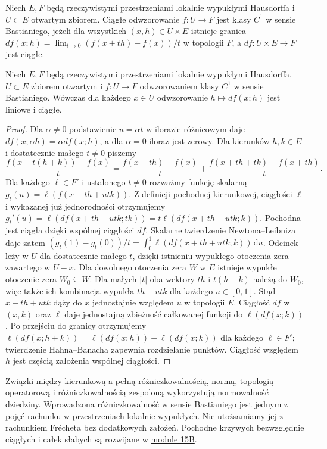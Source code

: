 \begin{definicja}
\label{def:bastiani14}
Niech $E,F$ będą rzeczywistymi przestrzeniami lokalnie
wypukłymi Hausdorffa i $U\subset E$ otwartym zbiorem.
Ciągłe odwzorowanie $f:U\to F$ jest klasy $C^1$ w sensie
Bastianiego, jeżeli dla wszystkich $(x,h)\in U\times E$
istnieje granica $df(x;h)=\lim_{t\to0}(f(x+th)-f(x))/t$
w topologii $F$, a $df:U\times E\to F$ jest ciągłe.
\end{definicja}
\begin{stwierdzenie}
\label{prop:bastiani-linear14}
Niech $E,F$ będą rzeczywistymi przestrzeniami lokalnie
wypukłymi Hausdorffa, $U\subset E$ zbiorem otwartym
i $f:U\to F$ odwzorowaniem klasy $C^1$ w sensie Bastianiego.
Wówczas dla każdego $x\in U$
odwzorowanie $h\mapsto df(x;h)$ jest liniowe i ciągłe.
\end{stwierdzenie}
\begin{proof}
Dla $\alpha\ne0$ podstawienie $u=\alpha t$ w ilorazie
różnicowym daje $df(x;\alpha h)=\alpha df(x;h)$,
a dla $\alpha=0$ iloraz jest zerowy. Dla kierunków
$h,k\in E$ i dostatecznie małego $t\ne0$ piszemy
\[
 \frac{f(x+t(h+k))-f(x)}{t}
 =\frac{f(x+th)-f(x)}t
  +\frac{f(x+th+tk)-f(x+th)}t .
\]
Dla każdego $\ell\in F'$ i ustalonego $t\ne0$ rozważmy
funkcję skalarną $g_t(u)=\ell(f(x+th+utk))$.
Z definicji pochodnej kierunkowej, ciągłości $\ell$
i wykazanej już jednorodności otrzymujemy
$g_t'(u)=\ell(df(x+th+utk;tk))=t\ell(df(x+th+utk;k))$.
Pochodna jest ciągła dzięki wspólnej ciągłości $df$.
Skalarne twierdzenie Newtona--Leibniza daje zatem
$(g_t(1)-g_t(0))/t=\int_0^1\ell(df(x+th+utk;k))\,\mathrm du$. Odcinek leży
w $U$ dla dostatecznie małego $t$, dzięki istnieniu
wypukłego otoczenia zera zawartego w $U-x$.
Dla dowolnego otoczenia zera $W$ w $E$ istnieje
wypukłe otoczenie zera $W_0\subseteq W$.
Dla małych $|t|$ oba wektory $th$ i $t(h+k)$ należą
do $W_0$, więc także ich kombinacja wypukła
$th+utk$ dla każdego $u\in[0,1]$.
Stąd $x+th+utk$ dąży do $x$ jednostajnie względem $u$
w topologii $E$. Ciągłość $df$ w $(x,k)$ oraz $\ell$
daje jednostajną zbieżność całkowanej funkcji do
$\ell(df(x;k))$. Po przejściu do granicy otrzymujemy
$\ell(df(x;h+k))=\ell(df(x;h))+\ell(df(x;k))$ dla
każdego $\ell\in F'$; twierdzenie Hahna--Banacha zapewnia
rozdzielanie punktów. Ciągłość względem $h$ jest częścią
założenia wspólnej ciągłości.
\end{proof}

\begin{uwaga}
Związki między kierunkową a pełną różniczkowalnością, normą, topologią operatorową i różniczkowalnością zespoloną wykorzystują normowalność dziedziny. Wprowadzona różniczkowalność w sensie Bastianiego jest jednym z pojęć rachunku w przestrzeniach lokalnie wypukłych. Nie utożsamiamy jej z rachunkiem Frécheta bez dodatkowych założeń. Pochodne krzywych bezwzględnie ciągłych i całek słabych są rozwijane w \hyperref[sec:integral-vector15b]{module 15B}.
\end{uwaga}
